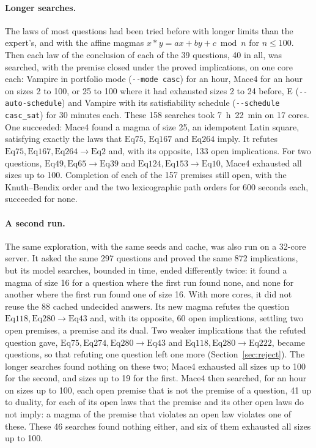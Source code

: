 \documentclass[11pt,a4paper]{article}
\theoremstyle{definition}
\theoremstyle{remark}
\newcommand{\code}[1]{\texttt{#1}}
\newcommand{\Eq}[1]{\mathrm{Eq}#1}
\begin{document}
\paragraph{Longer searches.}
The laws of most questions had been tried before with longer limits than the expert's, and with the affine magmas $x * y = ax + by + c \bmod n$ for $n \le 100$. Then each law of the conclusion of each of the 39 questions, 40 in all, was searched, with the premise closed under the proved implications, on one core each: Vampire in portfolio mode (\code{-{}-mode casc}) for an hour, Mace4 for an hour on sizes 2 to 100, or 25 to 100 where it had exhausted sizes 2 to 24 before, E (\code{-{}-auto-schedule}) and Vampire with its satisfiability schedule (\code{-{}-schedule casc\_sat}) for 30 minutes each. These 158 searches took 7~h~22~min on 17 cores. One succeeded: Mace4 found a magma of size 25, an idempotent Latin square, satisfying exactly the laws that $\Eq{75}$, $\Eq{167}$ and $\Eq{264}$ imply. It refutes $\Eq{75}, \Eq{167}, \Eq{264} \to \Eq{2}$ and, with its opposite, 133 open implications. For two questions, $\Eq{49}, \Eq{65} \to \Eq{39}$ and $\Eq{124}, \Eq{153} \to \Eq{10}$, Mace4 exhausted all sizes up to 100. Completion of each of the 157 premises still open, with the Knuth--Bendix order and the two lexicographic path orders for 600 seconds each, succeeded for none.

\paragraph{A second run.}
The same exploration, with the same seeds and cache, was also run on a 32-core server. It asked the same 297 questions and proved the same 872 implications, but its model searches, bounded in time, ended differently twice: it found a magma of size 16 for a question where the first run found none, and none for another where the first run found one of size 16. With more cores, it did not reuse the 88 cached undecided answers. Its new magma refutes the question $\Eq{118}, \Eq{280} \to \Eq{43}$ and, with its opposite, 60 open implications, settling two open premises, a premise and its dual. Two weaker implications that the refuted question gave, $\Eq{75}, \Eq{274}, \Eq{280} \to \Eq{43}$ and $\Eq{118}, \Eq{280} \to \Eq{222}$, became questions, so that refuting one question left one more (Section~\ref{sec:reject}). The longer searches found nothing on these two; Mace4 exhausted all sizes up to 100 for the second, and sizes up to 19 for the first. Mace4 then searched, for an hour on sizes up to 100, each open premise that is not the premise of a question, 41 up to duality, for each of its open laws that the premise and its other open laws do not imply: a magma of the premise that violates an open law violates one of these. These 46 searches found nothing either, and six of them exhausted all sizes up to 100.
\end{document}
